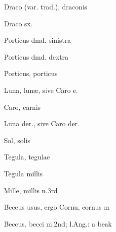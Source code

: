  {\mktsStyleItalic{}Draco\/} (var. {\mktsStyleItalic{}trad.\/}), draconis


 {\mktsStyleItalic{}Draco sx.\/}


 {\mktsStyleItalic{}Porticus dmd. sinistra\/}


 {\mktsStyleItalic{}Porticus dmd. dextra\/}


 {\mktsStyleItalic{}Porticus\/}, porticus


 {\mktsStyleItalic{}Luna\/}, lunæ, sive {\mktsStyleItalic{}Caro e.\/}


 {\mktsStyleItalic{}Caro\/}, carnis


 {\mktsStyleItalic{}Luna der.\/}, sive {\mktsStyleItalic{}Caro der.\/}


 {\mktsStyleItalic{}Sol\/}, solis


 {\mktsStyleItalic{}Tegula\/}, tegulae


 {\mktsStyleItalic{}Tegula millis\/}


 {\mktsStyleItalic{}Mille\/}, millis {\mktsStyleItalic{}n.3rd\/}


 {\mktsStyleItalic{}Beccus usus\/}, ergo {\mktsStyleItalic{}Cornu\/}, cornus {\mktsStyleItalic{}m\/}


 {\mktsStyleItalic{}Beccus\/}, becci {\mktsStyleItalic{}m.2nd\/}; l.Ang.: a beak


